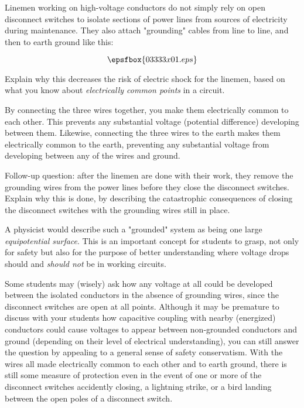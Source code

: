 

Linemen working on high-voltage conductors do not simply rely on open disconnect switches to isolate sections of power lines from sources of electricity during maintenance.  They also attach "grounding" cables from line to line, and then to earth ground like this:

$$\epsfbox{03333x01.eps}$$

Explain why this decreases the risk of electric shock for the linemen, based on what you know about {\it electrically common points} in a circuit.







By connecting the three wires together, you make them electrically common to each other.  This prevents any substantial voltage (potential difference) developing between them.  Likewise, connecting the three wires to the earth makes them electrically common to the earth, preventing any substantial voltage from developing between any of the wires and ground.

\vskip 10pt

Follow-up question: after the linemen are done with their work, they remove the grounding wires from the power lines before they close the disconnect switches.  Explain why this is done, by describing the catastrophic consequences of closing the disconnect switches with the grounding wires still in place.







A physicist would describe such a "grounded" system as being one large {\it equipotential surface}.  This is an important concept for students to grasp, not only for safety but also for the purpose of better understanding where voltage drops should and {\it should not} be in working circuits.

Some students may (wisely) ask how any voltage at all could be developed between the isolated conductors in the absence of grounding wires, since the disconnect switches are open at all points.  Although it may be premature to discuss with your students how capacitive coupling with nearby (energized) conductors could cause voltages to appear between non-grounded conductors and ground (depending on their level of electrical understanding), you can still answer the question by appealing to a general sense of safety conservatism.  With the wires all made electrically common to each other and to earth ground, there is still some measure of protection even in the event of one or more of the disconnect switches accidently closing, a lightning strike, or a bird landing between the open poles of a disconnect switch.

